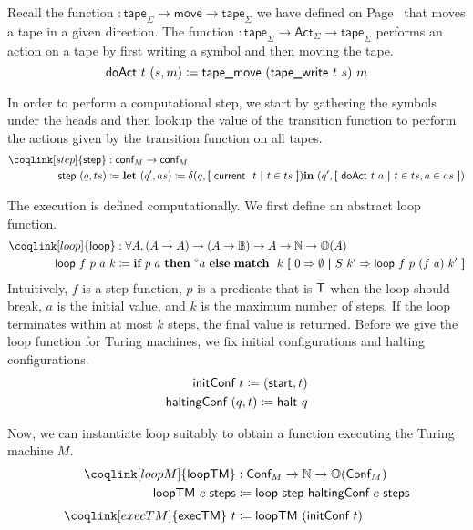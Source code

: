 Recall the function  $: \textsf{tape}_\Sigma \rightarrow \textsf{move} \rightarrow \textsf{tape}_\Sigma$ we have defined on Page~\pageref{fig:movetape} that moves a tape in a given direction. 
The function  $: \textsf{tape}_\Sigma \rightarrow \textsf{Act}_\Sigma \rightarrow \textsf{tape}_\Sigma$ performs an action on a tape by first writing a symbol and then moving the tape.
\[\textsf{doAct}~t~(s, m) \coloneqq \textsf{tape\_move}~(\textsf{tape\_write}~t~s)~m \]

In order to perform a computational step, we start by gathering the symbols under the heads and then lookup the value of the transition function to perform the actions given by the transition function on all tapes. 
\begin{align*}
  \coqlink[step]{\textsf{step}} &: \textsf{conf}_M \rightarrow \textsf{conf}_M \\
  \textsf{step}~(q, ts) &\defeq \llet (q', as) \defeq \delta (q, \withl \tmcurrent~t \withm t \in ts \withr) \lin (q', \withl \textsf{doAct}~t~a \withm t \in ts, a \in as \withr) 
\end{align*}

The execution is defined computationally. We first define an abstract loop function. 
\begin{align*}
  \coqlink[loop]{\textsf{loop}} &: \forall A, (A \rightarrow A) \rightarrow (A \rightarrow \bool) \rightarrow A \rightarrow \nat \rightarrow \opt{A} \\
  \textsf{loop}~f~p~a~k &\defeq \ITE{p~a}{\OSome{a}}{\match~k~\withl 0 \Rightarrow \ONone \withm S~k' \Rightarrow \textsf{loop}~f~p~(f~a)~k' \withr}
\end{align*}
Intuitively, $f$ is a step function, $p$ is a predicate that is $\mathsf{T}$ when the loop should break, $a$ is the initial value, and $k$ is the maximum number of steps. If the loop terminates within at most $k$ steps, the final value is returned.
Before we give the loop function for Turing machines, we fix initial configurations and halting configurations.
\begin{align*}
  \textsf{initConf}~t \coloneqq (\textsf{start}, t) \\
  \textsf{haltingConf}~(q, t) \coloneqq \textsf{halt}~q 
\end{align*}

Now, we can instantiate \textsf{loop} suitably to obtain a function executing the Turing machine $M$.
\begin{align*}
  \coqlink[loopM]{\textsf{loopTM}} &: \textsf{Conf}_M \rightarrow \nat \rightarrow \opt{\textsf{Conf}_M} \\
  \textsf{loopTM}~c~\textsf{steps} &\defeq \textsf{loop}~\textsf{step}~\textsf{haltingConf}~c~\textsf{steps} \\[0.7ex]
  \coqlink[execTM]{\textsf{execTM}}~t &\defeq \textsf{loopTM}~(\textsf{initConf}~t)
\end{align*}

